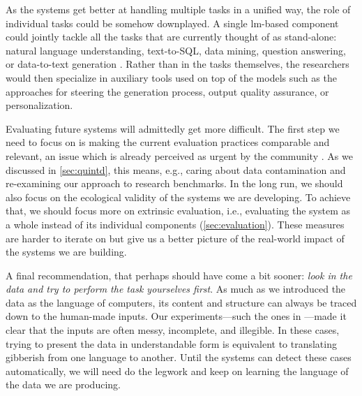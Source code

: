 As the systems get better at handling multiple tasks in a unified way, the role of individual tasks could be somehow downplayed. A single \ac{lm}-based component could jointly tackle all the tasks that are currently thought of as stand-alone: natural language understanding, text-to-SQL, data mining, question answering, or data-to-text generation \cite{schopf-etal-2023-exploring,chen2024multi}. Rather than in the tasks themselves, the researchers would then specialize in auxiliary tools used on top of the models such as the approaches for steering the generation process, output quality assurance, or personalization.


Evaluating future systems will admittedly get more difficult. The first step we need to focus on is making the current evaluation practices comparable and relevant, an issue which is already perceived as urgent by the community \cite{gehrmannRepairingCrackedFoundation2022,van_miltenburg_barriers_2023}.  As we discussed in \autoref{sec:quintd}, this means, e.g., caring about data contamination and re-examining our approach to research benchmarks. In the long run, we should also focus on the ecological validity of the systems we are developing. To achieve that, we should focus more on extrinsic evaluation, i.e., evaluating the system as a whole instead of its individual components (\autoref{sec:evaluation}). These measures are harder to iterate on but give us a better picture of the real-world impact of the systems we are building.

A final recommendation, that perhaps should have come a bit sooner: \emph{look in the data and try to perform the task yourselves first}. As much as we introduced the data as the language of computers, its content and structure can always be traced down to the human-made inputs. Our experiments---such the ones in ---made it clear that the inputs are often messy, incomplete, and illegible. In these cases, trying to present the data in understandable form is equivalent to translating gibberish from one language to another. Until the systems can detect these cases automatically, we will need do the legwork and keep on learning the language of the data we are producing.